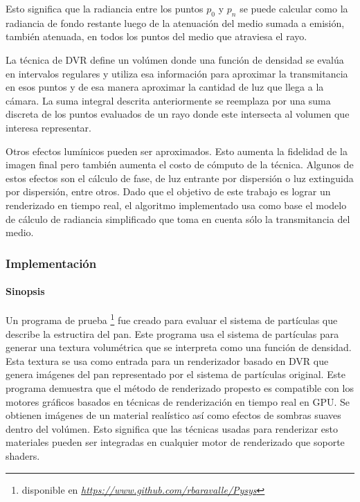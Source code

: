 \documentclass[oneside,a4paper,english,links]{amca}
\begin{document}
Esto significa que la radiancia entre los puntos $p_0$ y
$p_n$ se puede calcular como la radiancia de fondo restante luego de
la atenuación del medio sumada a emisión, también atenuada, en todos
los puntos del medio que atraviesa el rayo.

La técnica de DVR define un volúmen donde una función de densidad se
evalúa en intervalos regulares y utiliza esa información para
aproximar la transmitancia en esos puntos y de esa manera aproximar la
cantidad de luz que llega a la cámara. La suma integral descrita
anteriormente se reemplaza por una suma discreta de los puntos
evaluados de un rayo donde este intersecta al volumen que interesa
representar. 

Otros efectos lumínicos pueden ser aproximados. Esto aumenta la
fidelidad de la imagen final pero también aumenta el costo de cómputo
de la técnica. Algunos de estos efectos son el cálculo de fase, de
luz entrante por dispersión o luz extinguida por dispersión, entre
otros. Dado que el objetivo de este trabajo es lograr un renderizado
en tiempo real, el algoritmo implementado usa como base el modelo de
cálculo de radiancia simplificado que toma en cuenta sólo la
transmitancia del medio.

\subsubsection{Implementación}

\paragraph{Sinopsis}

Un programa de prueba \footnote{disponible en
  \emph{\url{https://www.github.com/rbaravalle/Pysys}}} fue creado
para evaluar el sistema de partículas que describe la estructira del
pan. Este programa usa el sistema de partículas para generar una
textura volumétrica que se interpreta como una función de
densidad. Esta textura se usa como entrada para un renderizador basado
en DVR que genera imágenes del pan representado por el sistema de
partículas original. Este programa demuestra que el método de
renderizado propesto es compatible con los motores gráficos basados en
técnicas de renderización en tiempo real en GPU. Se obtienen imágenes
de un material realístico así como efectos de sombras suaves dentro
del volúmen. Esto significa que las técnicas usadas para renderizar
esto materiales pueden ser integradas en cualquier motor de
renderizado que soporte shaders.
\end{document}
